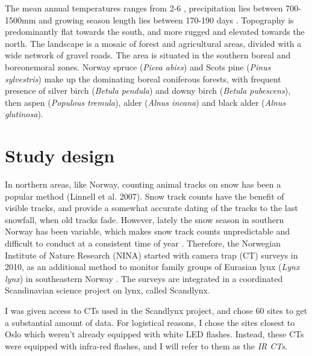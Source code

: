 The mean annual temperatures ranges from 2-6 \celsius , precipitation lies between 700-1500mm and growing season length lies between 170-190 days \autocite{Moen1999}.
Topography is predominantly flat towards the south, and more rugged and elevated towards the north. The landscape is a mosaic of forest and agricultural areas, divided with a wide network of gravel roads.
The area is situated in the southern boreal and boreonemoral zones. %
Norway spruce (\textit{Picea abies}) and Scots pine (\textit{Pinus sylvestris}) make up the dominating boreal coniferous forests, with frequent presence of silver birch (\textit{Betula pendula}) and downy birch (\textit{Betula pubescens}), then aspen (\textit{Populous tremula}), alder (\textit{Alnus incana}) and black alder (\textit{Alnus glutinosa}).



\section{Study design} 

In northern areas, like Norway, counting animal tracks on snow has been a popular method (Linnell et al. 2007). %
Snow track counts have the benefit of visible tracks, and provide a somewhat accurate dating of the tracks to the last snowfall, when old tracks fade.
However, lately the snow season in southern Norway has been variable, which makes snow track counts unpredictable and difficult to conduct at a consistent time of year \autocite{Odden2015}.
Therefore, the Norwegian Institute of Nature Research (NINA) started with camera trap (CT) surveys in 2010,  as an additional method to monitor family groups of Eurasian lynx (\textit{Lynx lynx}) in southeastern Norway  \autocite{Odden2015}. The surveys are integrated in a coordinated Scandinavian science project on lynx, called Scandlynx. 


I was given access to CTs used in the Scandlynx project, and chose 60 sites to get a substantial amount of data.
For logistical reasons, I chose the sites closest to Oslo which weren't already equipped with white LED flashes. 
Instead, these CTs were equipped with infra-red flashes, and I will refer to them as the \emph{IR CTs}.


